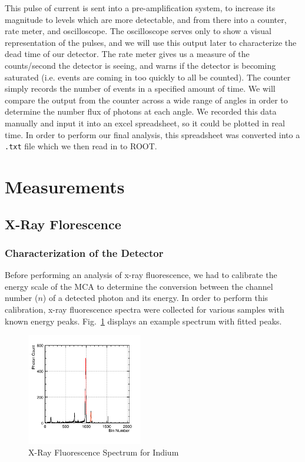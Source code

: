 \documentclass[%
 reprint,
 amsmath,amssymb,
 aps,
 pra,
]{revtex4-1}
\begin{document}
This pulse of current is sent into a pre-amplification system, to increase its magnitude to levels which are more detectable, and from there into a counter, rate meter, and oscilloscope. The oscilloscope serves only to show a visual representation of the pulses, and we will use this output later to characterize the dead time of our detector. The rate meter gives us a measure of the counts/second the detector is seeing, and warns if the detector is becoming saturated (i.e. events are coming in too quickly to all be counted). The counter simply records the number of events in a specified amount of time. We will compare the output from the counter across a wide range of angles in order to determine the number flux of photons at each angle. We recorded this data manually and input it into an excel spreadsheet, so it could be plotted in real time. In order to perform our final analysis, this spreadsheet was converted into a \verb|.txt| file which we then read in to ROOT.

\section{Measurements}

\subsection{X-Ray Florescence}

\subsubsection{Characterization of the Detector}

Before performing an analysis of x-ray fluorescence, we had to calibrate the energy scale of the MCA to determine the conversion between the channel number ($n$) of a detected photon and its energy. In order to perform this calibration, x-ray fluorescence spectra were collected for various samples with known energy peaks. Fig.~\ref{Fig:InXRFSpec} displays an example spectrum with fitted peaks.

\begin{figure}[H]
	\centering
	\includegraphics[width=0.45\textwidth]{InBinnedSpectrum.png}
	\caption{X-Ray Fluorescence Spectrum for Indium}
	\label{Fig:InXRFSpec}
\end{figure}
\end{document}

